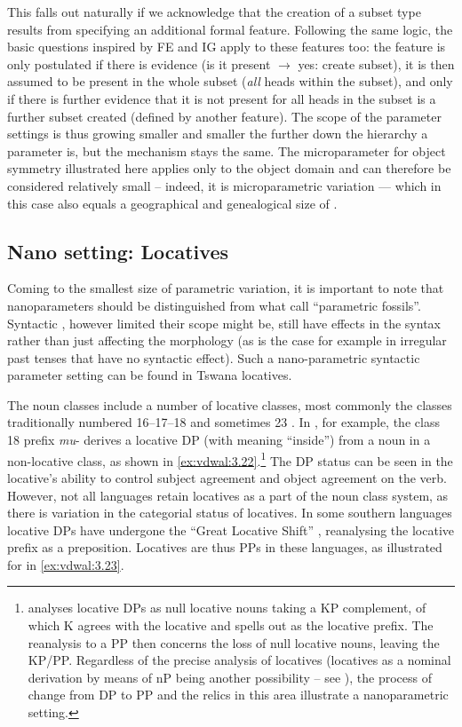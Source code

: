 \documentclass[output=paper]{langsci/langscibook}
\begin{document}
This falls out naturally if we acknowledge that the creation of a subset type
results from specifying an additional formal feature. Following the same logic,
the basic questions inspired by \gls{FE} and \gls{IG} apply to these features too: the
feature is only postulated if there is evidence (is it present $\to$ yes:
create subset), it is then assumed to be present in the whole subset
(\emph{all} heads within the subset), and only if there is further evidence
that it is not present for all heads in the subset is a further subset created
(defined by another feature). The scope of the parameter settings is thus
growing smaller and smaller the further down the hierarchy a parameter is, but
the mechanism stays the same. The microparameter for object symmetry
illustrated here applies only to the object domain and can therefore be
considered relatively small -- indeed, it is microparametric variation ---
which in this case also equals a geographical and genealogical size of
.

\subsection{Nano setting: Locatives}\label{sub:3.2.4}

Coming to the smallest size of parametric variation, it is important to note
that nanoparameters should be distinguished from what \citet[9]{BibRob2015b}
call “parametric fossils”. Syntactic , however limited their scope
might be, still have effects in the syntax rather than just affecting the
morphology (as is the case for example in irregular past tenses that have no
syntactic effect). Such a nano-parametric syntactic parameter setting can be
found in Tswana locatives.

The  noun classes include a number of locative classes, most
commonly the classes traditionally numbered 16--17--18 and sometimes 23
\citep{Meeussen1967}.  In , for example, the class 18 prefix
\emph{mu}- derives a locative DP (with meaning \enquote{inside}) from a noun in
a non-locative class, as shown in
\eqref{ex:vdwal:3.22}.\footnote{\citet{Carstens1997} analyses locative DPs as
    null locative nouns taking a KP complement, of which K agrees with the
    locative and spells out as the locative prefix. The reanalysis to a PP then
    concerns the loss of null locative nouns, leaving the KP/PP. Regardless of
    the precise analysis of locatives (locatives as a nominal derivation by
    means of nP being another possibility – see ),
the process of change from DP to PP and the relics in this area illustrate a
nanoparametric setting.} The DP status can be seen in the locative’s ability to
control subject agreement and object
agreement on the verb. However, not all
languages retain locatives as a part of the noun class system, as there is
variation in the categorial status of locatives. In some southern 
languages locative DPs have undergone the \enquote{Great Locative Shift}
\citep{Marten2010}, reanalysing the locative prefix as a preposition. Locatives
are thus PPs in these languages, as illustrated for  in
\eqref{ex:vdwal:3.23}.
\end{document}
